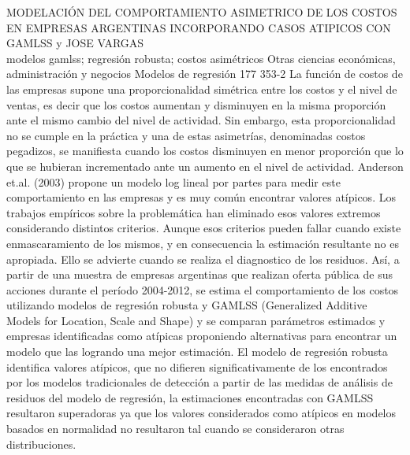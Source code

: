 \A
{MODELACIÓN DEL COMPORTAMIENTO ASIMETRICO DE LOS COSTOS EN EMPRESAS ARGENTINAS INCORPORANDO CASOS ATIPICOS CON GAMLSS}
{ y JOSE VARGAS}
{
\\}
{modelos gamlss; regresión robusta; costos asimétricos} 
 {Otras ciencias económicas, administración y negocios} 
 {Modelos de regresión} 
 {177} 
 {353-2}
{La función de costos de las empresas supone una proporcionalidad simétrica entre los costos y el nivel de ventas, es decir que los costos aumentan y disminuyen en la misma proporción ante el mismo cambio del nivel de actividad. Sin embargo, esta proporcionalidad no se cumple en la práctica y una de estas asimetrías, denominadas costos pegadizos, se manifiesta cuando los costos disminuyen en menor proporción que lo que se hubieran incrementado ante un aumento en el nivel de actividad. Anderson et.al. (2003) propone un modelo log lineal por partes para medir este comportamiento en las empresas y es muy común encontrar valores atípicos. Los trabajos empíricos sobre la problemática han eliminado esos valores extremos considerando distintos criterios. Aunque esos criterios pueden fallar cuando existe enmascaramiento de los mismos, y en consecuencia la estimación resultante no es apropiada. Ello se advierte cuando se realiza el diagnostico de los residuos. Así, a partir de una muestra de empresas argentinas que realizan oferta pública de sus acciones durante el período 2004-2012, se estima el comportamiento de los costos utilizando modelos de regresión robusta y GAMLSS (Generalized Additive Models for Location, Scale and Shape) y se comparan parámetros estimados y empresas identificadas como atípicas proponiendo alternativas para encontrar un modelo que las logrando una mejor estimación. El modelo de regresión robusta identifica valores atípicos, que no difieren significativamente de los encontrados por los modelos tradicionales de detección a partir de las medidas de análisis de residuos del modelo de regresión, la estimaciones encontradas con GAMLSS resultaron superadoras ya que los valores considerados como atípicos en modelos basados en normalidad no resultaron tal cuando se consideraron otras distribuciones. }
